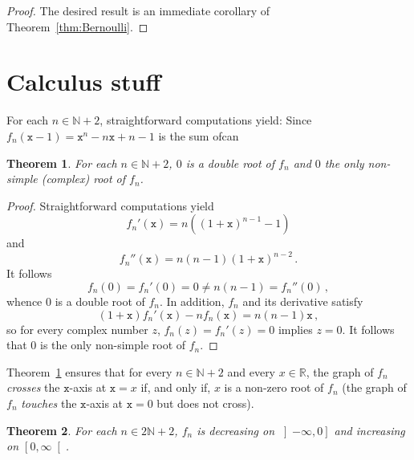 \documentclass[12pt]{article}
\newcommand{\bR}{\mathbb{R}}
\newcommand{\bN}{\mathbb{N}}
\newcommand{\geint}[1]{\left[ #1, \infty \right[}
\newcommand{\leint}[1]{\left]- \infty, #1 \right]}
\newcommand{\ttx}{\mathtt{x}}
\newtheorem{theorem}{Theorem}
\begin{document}
 \begin{proof}
   The desired result is an immediate corollary of Theorem~\ref{thm:Bernoulli}.
 \end{proof}

 
 \section{Calculus stuff}

 For each $n \in \bN + 2$, straightforward computations yield:
 Since $f_n(\ttx - 1) = \ttx^n - n \ttx + n - 1$ is the sum ofcan  
\begin{theorem} \label{thm:root-mult}
  For each $n \in \bN + 2$,
  $0$ is a double root of $f_n$ and $0$ the only non-simple (complex) root of $f_n$.
\end{theorem}

\begin{proof}
  Straightforward computations yield
  \begin{equation} \label{eq:deriv-fn} 
  f_n'(\ttx)  = n \left( {(1 + \ttx)}^{n - 1} -  1 \right) 
  \end{equation}
  and
  $$
  f_n''(\ttx)  = n (n - 1) {(1 + \ttx)}^{n - 2} \,.
  $$
  It follows
  $$
  f_n(0) = f_n'(0) = 0 \ne n (n - 1) = f_n''(0) \, ,
  $$
  whence $0$ is a double root of $f_n$.
  In addition, $f_n$ and its derivative satisfy 
   $$
   (1 + \ttx) f_n'(\ttx) - n f_n(\ttx) = n (n - 1) \ttx \, ,
   $$
   so for every complex number $z$, $f_n(z) = f_n'(z) = 0$ implies $z = 0$.
   It follows that $0$ is the only non-simple root of $f_n$.
 \end{proof}
 
 Theorem~\ref{thm:root-mult} ensures that
for every $n \in \bN + 2$ and every $x \in \bR$, 
the graph of $f_n$ \emph{crosses} the $\ttx$-axis at $\ttx = x$ if, and only if, $x$ is a non-zero root of $f_n$
(the graph of $f_n$ \emph{touches} the $\ttx$-axis at $\ttx = 0$ but does not cross).

 \begin{theorem} \label{thm:variation-even}
   For each $n \in 2 \bN + 2$,
   $f_n$ is
   decreasing on $\leint{0}$ and
   increasing on $\geint{0}$.
 \end{theorem}
\end{document}
